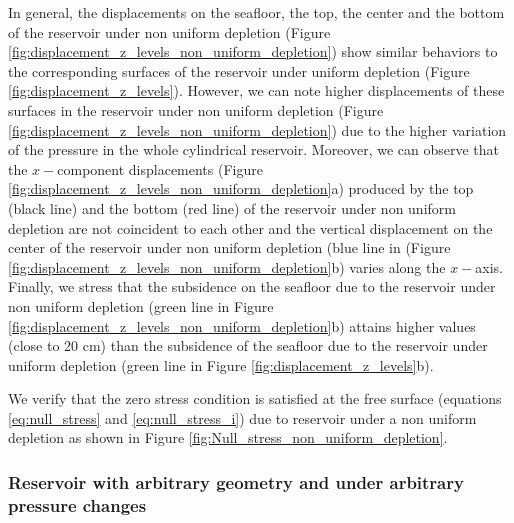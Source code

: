 \documentclass[journal abbreviation, manuscript]{copernicus}
\begin{document}
In general, the displacements on the seafloor, the top, the center and the bottom of the reservoir under non uniform depletion 
(Figure \ref{fig:displacement_z_levels_non_uniform_depletion}) show similar behaviors to the corresponding surfaces of the reservoir under uniform depletion 
(Figure \ref{fig:displacement_z_levels}).
However, we can note higher displacements of  these surfaces in the reservoir under non uniform depletion (Figure \ref{fig:displacement_z_levels_non_uniform_depletion}) due to the higher variation of the pressure in the whole cylindrical reservoir.
Moreover, we can observe that the $x-$component displacements
(Figure \ref{fig:displacement_z_levels_non_uniform_depletion}a)
produced by the top (black line) and the bottom (red line) of the reservoir under non uniform depletion are not coincident to each other and the vertical displacement on the center of the reservoir under non uniform depletion (blue line in (Figure \ref{fig:displacement_z_levels_non_uniform_depletion}b) varies along the $x-$axis.
Finally, we stress that the subsidence on the seafloor due to the reservoir under non uniform depletion 
(green line in Figure  \ref{fig:displacement_z_levels_non_uniform_depletion}b) attains higher values (close to 20 cm) than the subsidence of the seafloor due to the reservoir under uniform depletion (green line in Figure  \ref{fig:displacement_z_levels}b).

We verify that the zero stress condition is satisfied at the free surface (equations \ref{eq:null_stress} and \ref{eq:null_stress_i}) due to reservoir under a non uniform depletion as shown in Figure \ref{fig:Null_stress_non_uniform_depletion}.

\subsubsection{Reservoir with arbitrary geometry and under arbitrary pressure changes}
\end{document}
